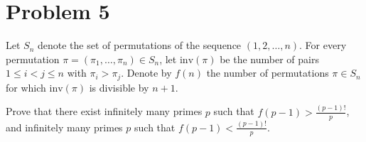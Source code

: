 \documentclass{article}
\begin{document}
\section*{Problem 5}
Let $S_n$ denote the set of permutations of the sequence $(1, 2, \dots, n)$. For every permutation $\pi = (\pi_1, \dots, \pi_n) \in S_n$, let $\mathrm{inv}(\pi)$ be the number of pairs $1 \le i < j \le n$ with $\pi_i > \pi_j$. Denote by $f(n)$ the number of permutations $\pi \in S_n$ for which $\mathrm{inv}(\pi)$ is divisible by $n+1$.

Prove that there exist infinitely many primes $p$ such that $f(p-1) > \frac{(p-1)!}{p}$, and infinitely many primes $p$ such that $f(p-1) < \frac{(p-1)!}{p}$.
\end{document}
